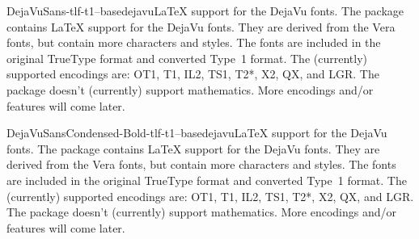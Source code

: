 \documentclass{ddltxtyp}
\begin{document}
\begin{package}{DejaVuSans-tlf-t1--base}{dejavu}{{\LaTeX} support for the DejaVu fonts.}
The package contains {\LaTeX} support for the DejaVu fonts. They
are derived from the Vera fonts, but contain more characters
and styles. The fonts are included in the original TrueType
format and converted Type~1 format. The (currently) supported
encodings are: OT1, T1, IL2, TS1, T2*, X2, QX, and LGR. The
package doesn't (currently) support mathematics. More encodings
and/or features will come later.
\end{package}

\begin{package}{DejaVuSansCondensed-Bold-tlf-t1--base}{dejavu}{{\LaTeX} support for the DejaVu fonts.}
The package contains {\LaTeX} support for the DejaVu fonts. They
are derived from the Vera fonts, but contain more characters
and styles. The fonts are included in the original TrueType
format and converted Type~1 format. The (currently) supported
encodings are: OT1, T1, IL2, TS1, T2*, X2, QX, and LGR. The
package doesn't (currently) support mathematics. More encodings
and/or features will come later.
\end{package}


\end{document}
